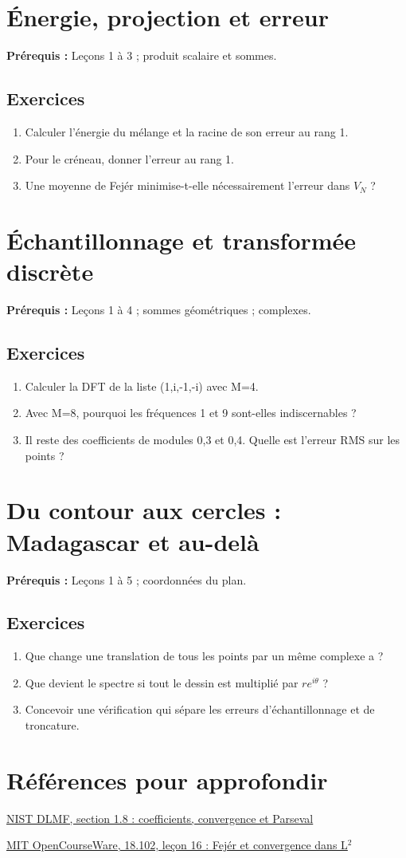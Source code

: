 \documentclass[11pt,a4paper]{article}
\begin{document}
\section{Énergie, projection et erreur}
\textbf{Prérequis :} Leçons 1 à 3 ; produit scalaire et sommes.
\subsection*{Exercices}\begin{enumerate}
\item Calculer l’énergie du mélange et la racine de son erreur au rang 1.
\item Pour le créneau, donner l’erreur au rang 1.
\item Une moyenne de Fejér minimise-t-elle nécessairement l’erreur dans $V_N$ ?
\end{enumerate}
\clearpage
\section{Échantillonnage et transformée discrète}
\textbf{Prérequis :} Leçons 1 à 4 ; sommes géométriques ; complexes.
\subsection*{Exercices}\begin{enumerate}
\item Calculer la DFT de la liste (1,i,-1,-i) avec M=4.
\item Avec M=8, pourquoi les fréquences 1 et 9 sont-elles indiscernables ?
\item Il reste des coefficients de modules 0,3 et 0,4. Quelle est l’erreur RMS sur les points ?
\end{enumerate}
\clearpage
\section{Du contour aux cercles : Madagascar et au-delà}
\textbf{Prérequis :} Leçons 1 à 5 ; coordonnées du plan.
\subsection*{Exercices}\begin{enumerate}
\item Que change une translation de tous les points par un même complexe a ?
\item Que devient le spectre si tout le dessin est multiplié par $re^{i\theta}$ ?
\item Concevoir une vérification qui sépare les erreurs d’échantillonnage et de troncature.
\end{enumerate}
\clearpage
\section*{Références pour approfondir}
\par\href{https://dlmf.nist.gov/1.8}{NIST DLMF, section 1.8 : coefficients, convergence et Parseval}
\par\href{https://ocw.mit.edu/courses/18-102-introduction-to-functional-analysis-spring-2021/resources/lecture-16-fejers-theorem-and-convergence-of-fourier-series/}{MIT OpenCourseWare, 18.102, leçon 16 : Fejér et convergence dans L$^2$}
\end{document}
